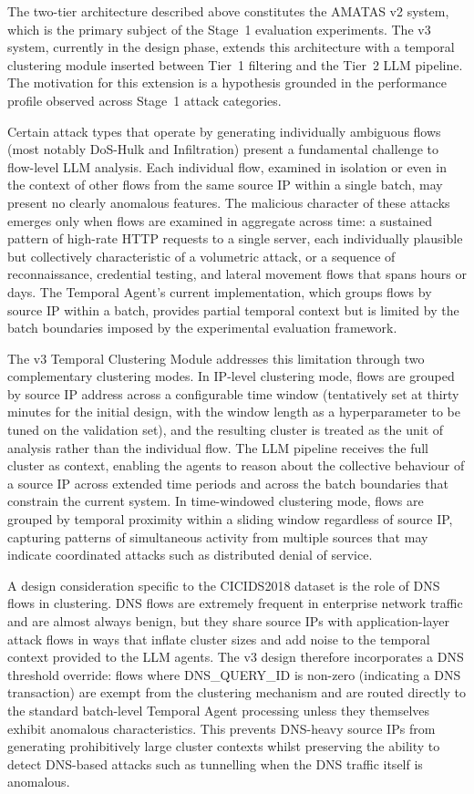 \documentclass[../main.tex]{subfiles}
\begin{document}
The two-tier architecture described above constitutes the AMATAS v2 system, which is the primary subject of the Stage~1 evaluation experiments. The v3 system, currently in the design phase, extends this architecture with a temporal clustering module inserted between Tier~1 filtering and the Tier~2 LLM pipeline. The motivation for this extension is a hypothesis grounded in the performance profile observed across Stage~1 attack categories.

Certain attack types that operate by generating individually ambiguous flows (most notably DoS-Hulk and Infiltration) present a fundamental challenge to flow-level LLM analysis. Each individual flow, examined in isolation or even in the context of other flows from the same source IP within a single batch, may present no clearly anomalous features. The malicious character of these attacks emerges only when flows are examined in aggregate across time: a sustained pattern of high-rate HTTP requests to a single server, each individually plausible but collectively characteristic of a volumetric attack, or a sequence of reconnaissance, credential testing, and lateral movement flows that spans hours or days. The Temporal Agent's current implementation, which groups flows by source IP within a batch, provides partial temporal context but is limited by the batch boundaries imposed by the experimental evaluation framework.

The v3 Temporal Clustering Module addresses this limitation through two complementary clustering modes. In IP-level clustering mode, flows are grouped by source IP address across a configurable time window (tentatively set at thirty minutes for the initial design, with the window length as a hyperparameter to be tuned on the validation set), and the resulting cluster is treated as the unit of analysis rather than the individual flow. The LLM pipeline receives the full cluster as context, enabling the agents to reason about the collective behaviour of a source IP across extended time periods and across the batch boundaries that constrain the current system. In time-windowed clustering mode, flows are grouped by temporal proximity within a sliding window regardless of source IP, capturing patterns of simultaneous activity from multiple sources that may indicate coordinated attacks such as distributed denial of service.

A design consideration specific to the CICIDS2018 dataset is the role of DNS flows in clustering. DNS flows are extremely frequent in enterprise network traffic and are almost always benign, but they share source IPs with application-layer attack flows in ways that inflate cluster sizes and add noise to the temporal context provided to the LLM agents. The v3 design therefore incorporates a DNS threshold override: flows where DNS\_QUERY\_ID is non-zero (indicating a DNS transaction) are exempt from the clustering mechanism and are routed directly to the standard batch-level Temporal Agent processing unless they themselves exhibit anomalous characteristics. This prevents DNS-heavy source IPs from generating prohibitively large cluster contexts whilst preserving the ability to detect DNS-based attacks such as tunnelling when the DNS traffic itself is anomalous.
\end{document}
